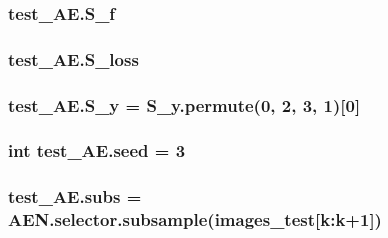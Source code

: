 \subsubsection[{\texorpdfstring{S\+\_\+f}{S_f}}]{\setlength{\rightskip}{0pt plus 5cm}test\+\_\+\+A\+E.\+S\+\_\+f}\hypertarget{namespacetest___a_e_a29ce99f614666248891781c6a39cfb3b}{}\label{namespacetest___a_e_a29ce99f614666248891781c6a39cfb3b}
\subsubsection[{\texorpdfstring{S\+\_\+loss}{S_loss}}]{\setlength{\rightskip}{0pt plus 5cm}test\+\_\+\+A\+E.\+S\+\_\+loss}\hypertarget{namespacetest___a_e_ae14c86538ec827a806110649ffa666b9}{}\label{namespacetest___a_e_ae14c86538ec827a806110649ffa666b9}
\subsubsection[{\texorpdfstring{S\+\_\+y}{S_y}}]{\setlength{\rightskip}{0pt plus 5cm}test\+\_\+\+A\+E.\+S\+\_\+y = S\+\_\+y.\+permute(0, 2, 3, 1)\mbox{[}0\mbox{]}}\hypertarget{namespacetest___a_e_a6ddb7593a8dca923d37640620839432d}{}\label{namespacetest___a_e_a6ddb7593a8dca923d37640620839432d}
\subsubsection[{\texorpdfstring{seed}{seed}}]{\setlength{\rightskip}{0pt plus 5cm}int test\+\_\+\+A\+E.\+seed = 3}\hypertarget{namespacetest___a_e_a8a9c6e1198befd718530e83f8f1e5d58}{}\label{namespacetest___a_e_a8a9c6e1198befd718530e83f8f1e5d58}
\subsubsection[{\texorpdfstring{subs}{subs}}]{\setlength{\rightskip}{0pt plus 5cm}test\+\_\+\+A\+E.\+subs = A\+E\+N.\+selector.\+subsample({\bf images\+\_\+test}\mbox{[}k\+:k+1\mbox{]})}\hypertarget{namespacetest___a_e_adab2099a4a8c25f911722a1641978ea8}{}\label{namespacetest___a_e_adab2099a4a8c25f911722a1641978ea8}
